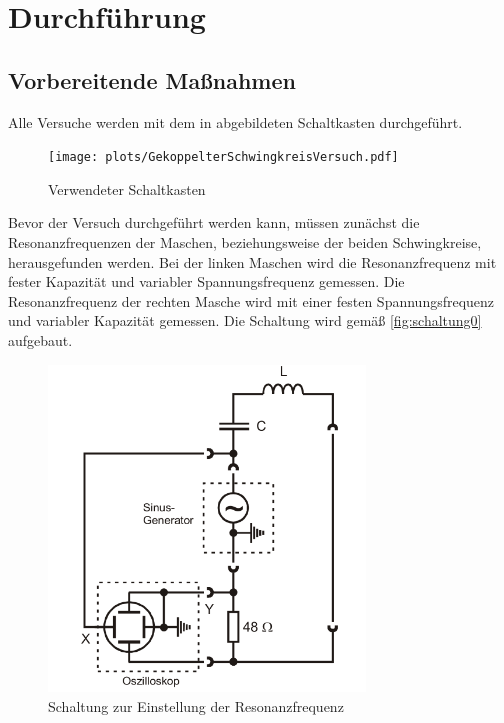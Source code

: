 \section{Durchführung}
\label{sec:Durchführung}

\subsection{Vorbereitende Maßnahmen}
Alle Versuche werden mit dem in abgebildeten Schaltkasten durchgeführt.
\begin{figure}[H]
    \centering
    \texttt{[image: plots/GekoppelterSchwingkreisVersuch.pdf]}
    \caption{Verwendeter Schaltkasten}
    \label{fig:kasten}
\end{figure}

\noindent Bevor der Versuch durchgeführt werden kann, müssen zunächst die Resonanzfrequenzen der Maschen, beziehungsweise der beiden Schwingkreise,
herausgefunden werden.
Bei der linken Maschen wird die Resonanzfrequenz mit fester Kapazität und variabler Spannungsfrequenz %
gemessen. Die Resonanzfrequenz der rechten Masche wird mit einer festen Spannungsfrequenz und variabler Kapazität  gemessen.
Die Schaltung wird gemäß \autoref{fig:schaltung0} aufgebaut.
\begin{figure}[H]
    \centering
    \includegraphics[width=0.75\textwidth]{plots/Schaltung0.png}
    \caption{Schaltung zur Einstellung der Resonanzfrequenz \cite{Versuchsanleitung}}
    \label{fig:schaltung0}
\end{figure}

